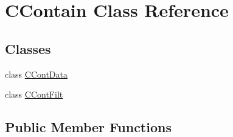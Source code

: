 \hypertarget{class_c_contain}{\section{C\-Contain Class Reference}
\label{class_c_contain}
}
\subsection*{Classes}
\begin{DoxyCompactItemize}
\item 
class \hyperlink{class_c_contain_1_1_c_cont_data}{C\-Cont\-Data}
\item 
class \hyperlink{class_c_contain_1_1_c_cont_filt}{C\-Cont\-Filt}
\end{DoxyCompactItemize}
\subsection*{Public Member Functions}

